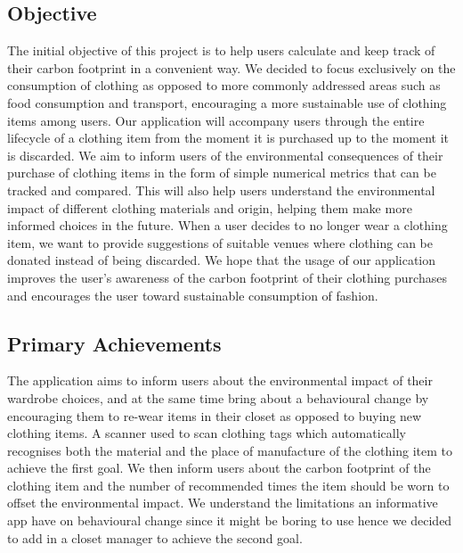 \documentclass[a4paper, 11pt]{article}
\begin{document}
    \subsection{Objective}
      The initial objective of this project is to help users calculate and keep track of their carbon footprint in a convenient way. We decided to focus exclusively on the consumption of clothing as opposed to more commonly addressed areas such as food consumption and transport, encouraging a more sustainable use of clothing items among users. Our application will accompany users through the entire lifecycle of a clothing item from the moment it is purchased up to the moment it is discarded. We aim to inform users of the environmental consequences of their purchase of clothing items in the form of simple numerical metrics that can be tracked and compared. This will also help users understand the environmental impact of different clothing materials and origin, helping them make more informed choices in the future. When a user decides to no longer wear a clothing item, we want to provide suggestions of suitable venues where clothing can be donated instead of being discarded. We hope that the usage of our application improves the user’s awareness of the carbon footprint of their clothing purchases and encourages the user toward sustainable consumption of fashion. 
    \subsection{Primary Achievements}
      The application aims to inform users about the environmental impact of their wardrobe choices, and at the same time bring about a behavioural change by encouraging them to re-wear items in their closet as opposed to buying new clothing items. A scanner used to scan clothing tags which automatically recognises both the material and the place of manufacture of the clothing item to achieve the first goal. We then inform users about the carbon footprint of the clothing item and the number of recommended times the item should be worn to offset the environmental impact. We understand the limitations an informative app have on behavioural change since it might be boring to use hence we decided to add in a closet manager to achieve the second goal. 
\end{document}
